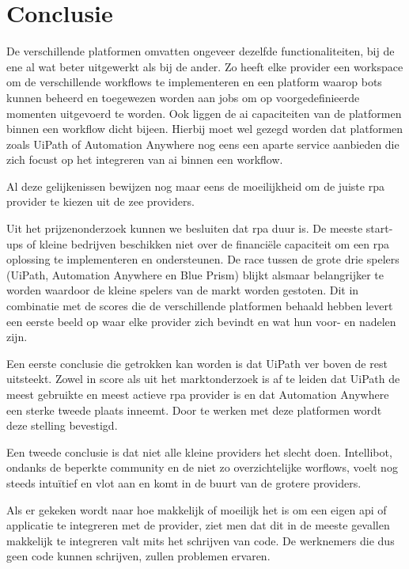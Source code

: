 \chapter{Conclusie}
\label{ch:conclusie}
De verschillende platformen omvatten ongeveer dezelfde functionaliteiten, bij de ene al wat beter uitgewerkt als bij de ander. Zo heeft elke provider een workspace om de verschillende \gls{workflow}s te implementeren en een platform waarop bots kunnen beheerd en toegewezen worden aan jobs om op voorgedefinieerde momenten uitgevoerd te worden. Ook liggen de \acrshort{ai} capaciteiten van de platformen binnen een \gls{workflow} dicht bijeen. Hierbij moet wel gezegd worden dat platformen zoals UiPath of Automation Anywhere nog eens een aparte service aanbieden die zich focust op het integreren van \acrshort{ai} binnen een \gls{workflow}.

Al deze gelijkenissen bewijzen nog maar eens de moeilijkheid om de juiste \acrshort{rpa} provider te kiezen uit de zee providers.

Uit het prijzenonderzoek kunnen we besluiten dat \acrshort{rpa} duur is. De meeste start-ups of kleine bedrijven beschikken niet over de financiële capaciteit om een \acrshort{rpa} oplossing te implementeren en ondersteunen. De race tussen de grote drie spelers (UiPath, Automation Anywhere en Blue Prism) blijkt alsmaar belangrijker te worden waardoor de kleine spelers van de markt worden gestoten. Dit in combinatie met de scores die de verschillende platformen behaald hebben levert een eerste beeld op waar elke provider zich bevindt en wat hun voor- en nadelen zijn.

Een eerste conclusie die getrokken kan worden is dat UiPath ver boven de rest uitsteekt. Zowel in score als uit het marktonderzoek is af te leiden dat UiPath de meest gebruikte en meest actieve \acrshort{rpa} provider is en dat Automation Anywhere een sterke tweede plaats inneemt. Door te werken met deze platformen wordt deze stelling bevestigd.

Een tweede conclusie is dat niet alle kleine providers het slecht doen. Intellibot, ondanks de beperkte community en de niet zo overzichtelijke worflows, voelt nog steeds intuïtief en vlot aan en komt in de buurt van de grotere providers.

Als er gekeken wordt naar hoe makkelijk of moeilijk het is om een eigen \acrshort{api} of applicatie te integreren met de provider, ziet men dat dit in de meeste gevallen makkelijk te integreren valt mits het schrijven van code. De werknemers die dus geen code kunnen schrijven, zullen problemen ervaren.

